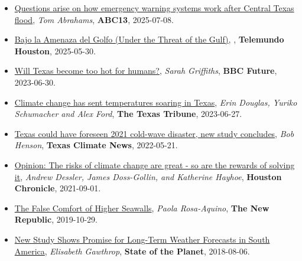 \documentclass[10pt,oneside]{article}
\begin{document}
\begin{itemize}[label={}]
  \item \href{https://abc13.com/post/questions-arise-how-emergency-warning-systems-work-central-texas-flood/17024010/}{Questions arise on how emergency warning systems work after Central Texas flood}, \textit{Tom Abrahams}, \textbf{ABC13}, 2025-07-08.

  \item \href{https://www.telemundohouston.com/noticias/bajo-la-amenaza-del-golfo-parte-1-2/2494095/}{Bajo la Amenaza del Golfo (Under the Threat of the Gulf)}, \textit{}, \textbf{Telemundo Houston}, 2025-05-30.

  \item \href{https://www.bbc.com/future/article/20230630-will-texas-become-too-hot-for-humans}{Will Texas become too hot for humans?}, \textit{Sarah Griffiths}, \textbf{BBC Future}, 2023-06-30.

  \item \href{https://www.texastribune.org/2023/06/27/texas-climate-change-heat/}{Climate change has sent temperatures soaring in Texas}, \textit{Erin Douglas, Yuriko Schumacher and Alex Ford}, \textbf{The Texas Tribune}, 2023-06-27.

  \item \href{https://texasclimatenews.org/2022/05/21/texas-could-have-foreseen-2021-cold-wave-disaster-new-study-concludes/}{Texas could have foreseen 2021 cold-wave disaster, new study concludes}, \textit{Bob Henson}, \textbf{Texas Climate News}, 2022-05-21.

  \item \href{https://www.houstonchronicle.com/opinion/outlook/article/Opinion-The-risks-of-climate-change-are-great-16426616.php}{Opinion: The risks of climate change are great - so are the rewards of solving it}, \textit{Andrew Dessler, James Doss-Gollin, and Katherine Hayhoe}, \textbf{Houston Chronicle}, 2021-09-01.

  \item \href{https://newrepublic.com/article/155519/false-comfort-higher-seawalls}{The False Comfort of Higher Seawalls}, \textit{Paola Rosa-Aquino}, \textbf{The New Republic}, 2019-10-29.

  \item \href{https://blogs.ei.columbia.edu/2018/08/06/subseasonal-weather-forecasts-paraguay/}{New Study Shows Promise for Long-Term Weather Forecasts in South America}, \textit{Elisabeth Gawthrop}, \textbf{State of the Planet}, 2018-08-06.

\end{itemize}
\end{document}
